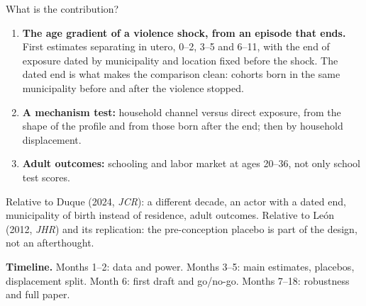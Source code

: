 \documentclass[aspectratio=169,10pt]{beamer}
\begin{document}
\begin{frame}{What is the contribution?}
\begin{enumerate}
\item \textbf{The age gradient of a violence shock, from an episode that ends.} First estimates separating in utero, 0--2, 3--5 and 6--11, with the end of exposure dated by municipality and location fixed before the shock. The dated end is what makes the comparison clean: cohorts born in the same municipality before and after the violence stopped.
\item \textbf{A mechanism test:} household channel versus direct exposure, from the shape of the profile and from those born after the end; then by household displacement.
\item \textbf{Adult outcomes:} schooling and labor market at ages 20--36, not only school test scores.
\end{enumerate}
\vspace{0.6em}
\small
Relative to Duque (2024, \emph{JCR}): a different decade, an actor with a dated end, municipality of birth instead of residence, adult outcomes. Relative to León (2012, \emph{JHR}) and its replication: the pre-conception placebo is part of the design, not an afterthought.
\vspace{0.6em}

\textbf{Timeline.} Months 1--2: data and power. Months 3--5: main estimates, placebos, displacement split. Month 6: first draft and go/no-go. Months 7--18: robustness and full paper.
\end{frame}
\end{document}
